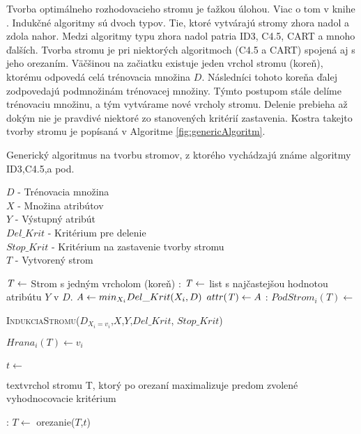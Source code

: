 Tvorba optimálneho rozhodovacieho stromu je ťažkou úlohou. Viac o tom v knihe \cite[s.51]{kap1-DataMiningForTrees}. Indukčné algoritmy sú dvoch typov. Tie, ktoré vytvárajú stromy zhora nadol a zdola nahor. Medzi algoritmy typu zhora nadol patria ID3, C4.5, CART a mnoho ďalších. Tvorba stromu je pri niektorých algoritmoch (C4.5 a CART) spojená aj s jeho orezaním. Väčšinou na začiatku existuje jeden vrchol stromu (koreň), ktorému odpovedá celá trénovacia množina $D$. Následníci tohoto koreňa ďalej zodpovedajú podmnožinám trénovacej množiny. Týmto postupom stále delíme trénovaciu množinu, a tým vytvárame nové vrcholy stromu. Delenie prebieha až dokým nie je pravdivé niektoré zo stanovených kritérií zastavenia. Kostra takejto tvorby stromu je popísaná v Algoritme  \ref{fig:genericAlgoritm}.

\begin{algorithm} 
\caption{Generický algoritmus na tvorbu stromov, z ktorého vychádzajú známe algoritmy ID3,C4.5,a pod.}\label{fig:genericAlgoritm}
$D$ - Trénovacia množina \\
$X$ - Množina atribútov \\
$Y$ - Výstupný atribút \\
$Del\_Krit$ - Kritérium pre delenie \\
$Stop\_Krit$ - Kritérium na zastavenie tvorby stromu \\
$T$ - Vytvorený strom 
\begin{algorithmic}
\State $\mathit{T} \gets $ Strom s jedným vrcholom (koreň)
:	  
\State $\mathit{T} \gets $ list s najčastejšou hodnotou atribútu $Y$ v $D$.
\Else
\State $\mathit{A} \gets min_{X_{i}}Del\_Krit(X_{i},D)$
\State $attr(\mathit{T}) \gets A$
\EndIf
{}:
\State $PodStrom_{i}(T) \gets $ \parbox[t]{280pt}{\textsc{IndukciaStromu}($D_{X_{i} = v_{i}}$,$X$,$Y$,$Del\_Krit$, $Stop\_Krit$)} 
\State $Hrana_{i}(T) \gets v_{i}$  
\EndFor \\
\EndFunction
\\
\Repeat 
\State $t \gets$ \parbox[t]{350pt}{textvrchol stromu T, ktorý po orezaní maximalizuje predom zvolené vyhodnocovacie kritérium}
:
\State $T \gets$ orezanie($T$,$t$)
\EndIf
{} \\
\EndFunction
\end{algorithmic}
\end{algorithm}

